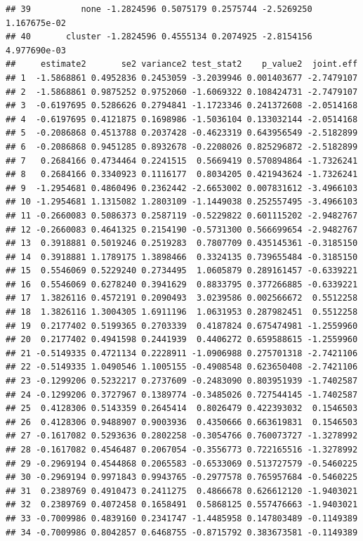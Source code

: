 \documentclass[
]{article}
\begin{document}
\begin{verbatim}
## 39          none -1.2824596 0.5075179 0.2575744 -2.5269250 1.167675e-02
## 40       cluster -1.2824596 0.4555134 0.2074925 -2.8154156 4.977690e-03
##     estimate2       se2 variance2 test_stat2    p_value2  joint.eff
## 1  -1.5868861 0.4952836 0.2453059 -3.2039946 0.001403677 -2.7479107
## 2  -1.5868861 0.9875252 0.9752060 -1.6069322 0.108424731 -2.7479107
## 3  -0.6197695 0.5286626 0.2794841 -1.1723346 0.241372608 -2.0514168
## 4  -0.6197695 0.4121875 0.1698986 -1.5036104 0.133032144 -2.0514168
## 5  -0.2086868 0.4513788 0.2037428 -0.4623319 0.643956549 -2.5182899
## 6  -0.2086868 0.9451285 0.8932678 -0.2208026 0.825296872 -2.5182899
## 7   0.2684166 0.4734464 0.2241515  0.5669419 0.570894864 -1.7326241
## 8   0.2684166 0.3340923 0.1116177  0.8034205 0.421943624 -1.7326241
## 9  -1.2954681 0.4860496 0.2362442 -2.6653002 0.007831612 -3.4966103
## 10 -1.2954681 1.1315082 1.2803109 -1.1449038 0.252557495 -3.4966103
## 11 -0.2660083 0.5086373 0.2587119 -0.5229822 0.601115202 -2.9482767
## 12 -0.2660083 0.4641325 0.2154190 -0.5731300 0.566699654 -2.9482767
## 13  0.3918881 0.5019246 0.2519283  0.7807709 0.435145361 -0.3185150
## 14  0.3918881 1.1789175 1.3898466  0.3324135 0.739655484 -0.3185150
## 15  0.5546069 0.5229240 0.2734495  1.0605879 0.289161457 -0.6339221
## 16  0.5546069 0.6278240 0.3941629  0.8833795 0.377266885 -0.6339221
## 17  1.3826116 0.4572191 0.2090493  3.0239586 0.002566672  0.5512258
## 18  1.3826116 1.3004305 1.6911196  1.0631953 0.287982451  0.5512258
## 19  0.2177402 0.5199365 0.2703339  0.4187824 0.675474981 -1.2559960
## 20  0.2177402 0.4941598 0.2441939  0.4406272 0.659588615 -1.2559960
## 21 -0.5149335 0.4721134 0.2228911 -1.0906988 0.275701318 -2.7421106
## 22 -0.5149335 1.0490546 1.1005155 -0.4908548 0.623650408 -2.7421106
## 23 -0.1299206 0.5232217 0.2737609 -0.2483090 0.803951939 -1.7402587
## 24 -0.1299206 0.3727967 0.1389774 -0.3485026 0.727544145 -1.7402587
## 25  0.4128306 0.5143359 0.2645414  0.8026479 0.422393032  0.1546503
## 26  0.4128306 0.9488907 0.9003936  0.4350666 0.663619831  0.1546503
## 27 -0.1617082 0.5293636 0.2802258 -0.3054766 0.760073727 -1.3278992
## 28 -0.1617082 0.4546487 0.2067054 -0.3556773 0.722165516 -1.3278992
## 29 -0.2969194 0.4544868 0.2065583 -0.6533069 0.513727579 -0.5460225
## 30 -0.2969194 0.9971843 0.9943765 -0.2977578 0.765957684 -0.5460225
## 31  0.2389769 0.4910473 0.2411275  0.4866678 0.626612120 -1.9403021
## 32  0.2389769 0.4072458 0.1658491  0.5868125 0.557476663 -1.9403021
## 33 -0.7009986 0.4839160 0.2341747 -1.4485958 0.147803489 -0.1149389
## 34 -0.7009986 0.8042857 0.6468755 -0.8715792 0.383673581 -0.1149389

\end{verbatim}
\end{document}
